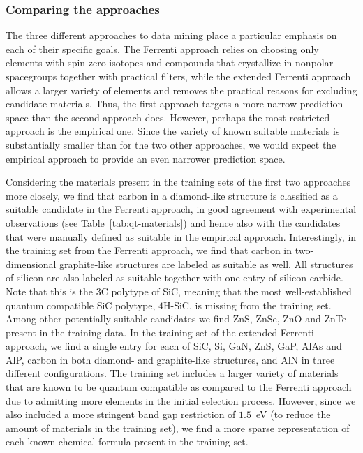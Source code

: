 \documentclass[superscriptaddress,unsortedaddress,
 amsmath,amssymb,
 aps,
]{revtex4-2}
\begin{document}
\subsubsection*{Comparing the approaches}
The three different approaches to data mining place a particular emphasis on each of their specific goals. The Ferrenti approach relies on choosing only elements with spin zero isotopes and compounds that crystallize in nonpolar spacegroups together with practical filters, while the extended Ferrenti approach allows a larger variety of elements and removes the practical reasons for excluding candidate materials. Thus, the first approach targets a more narrow prediction space than the second approach does. However, perhaps the most restricted approach is the empirical one. Since the variety of known suitable materials is substantially smaller than for the two other approaches, we would expect the empirical approach to provide an even narrower prediction space. %

Considering the materials present in the training sets of the first two approaches more closely, we find that  carbon in a diamond-like structure is classified as a suitable candidate in the Ferrenti approach, in good agreement with experimental observations (see Table~\ref{tab:qt-materials}) and hence also with the candidates that were manually defined as suitable in the empirical approach.   Interestingly, in the training set from the Ferrenti approach, we find that carbon in two-dimensional graphite-like structures are labeled as suitable as well. All structures of silicon are also labeled as suitable together with one entry of silicon carbide. Note that this is the $3$C polytype of SiC, meaning that the most well-established quantum compatible SiC polytype, $4$H-SiC, is missing from the training set. Among other potentially suitable candidates we find ZnS, ZnSe, ZnO and ZnTe present in the training data.  
In the training set of the extended Ferrenti approach, we find a single entry for each of SiC, Si, GaN, ZnS, GaP, AlAs and AlP, carbon in both diamond- and graphite-like structures, and AlN in three different configurations. The training set includes a larger variety of materials that are known to be quantum compatible as compared to the Ferrenti approach due to admitting more elements in the initial selection process. However, since we also included a more stringent band gap restriction of $1.5$~eV (to reduce the amount of materials in the training set), we find a more sparse representation of each known chemical formula present in the training set. 
\end{document}
